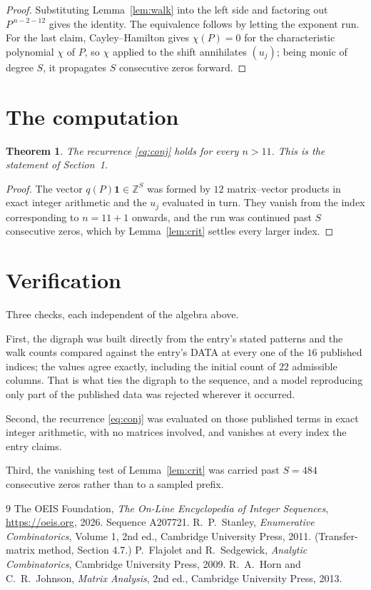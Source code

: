\documentclass[11pt,a4paper]{article}
\theoremstyle{plain}
\newtheorem{theorem}{Theorem}
\theoremstyle{definition}
\begin{document}
\begin{proof}
Substituting Lemma~\ref{lem:walk} into the left side and factoring out
$P^{\,n-2-12}$ gives the identity. The equivalence follows by letting the exponent
run. For the last claim, Cayley--Hamilton gives $\chi(P)=0$ for the characteristic
polynomial $\chi$ of $P$, so $\chi$ applied to the shift annihilates $(u_j)$; being monic of
degree $S$, it propagates $S$ consecutive zeros forward.
\end{proof}

\section{The computation}

\begin{theorem}
The recurrence \eqref{eq:conj} holds for every $n>11$. This is the statement of
Section~1.
\end{theorem}

\begin{proof}
The vector $q(P)\mathbf{1}\in\mathbb{Z}^{S}$ was formed by $12$ matrix--vector
products in exact integer arithmetic and the $u_j$ evaluated in turn. They vanish from the
index corresponding to $n=11+1$ onwards, and the run was continued past $S$ consecutive
zeros, which by Lemma~\ref{lem:crit} settles every larger index.
\end{proof}

\section{Verification}

Three checks, each independent of the algebra above.

First, the digraph was built directly from the entry's stated patterns and the walk counts
compared against the entry's DATA at every one of the $16$ published indices; the
values agree exactly, including the initial count of $22$ admissible columns. That is
what ties the digraph to the sequence, and a model reproducing only part of the published
data was rejected wherever it occurred.

Second, the recurrence \eqref{eq:conj} was evaluated on those published terms in exact
integer arithmetic, with no matrices involved, and vanishes at every index the entry claims.

Third, the vanishing test of Lemma~\ref{lem:crit} was carried past $S=484$ consecutive
zeros rather than to a sampled prefix.

\begin{thebibliography}{9}
 The OEIS Foundation, \emph{The On-Line Encyclopedia of Integer
Sequences}, \url{https://oeis.org}, 2026. Sequence A207721.
 R.~P.~Stanley, \emph{Enumerative Combinatorics}, Volume 1, 2nd ed.,
Cambridge University Press, 2011. (Transfer-matrix method, Section 4.7.)
 P.~Flajolet and R.~Sedgewick, \emph{Analytic Combinatorics}, Cambridge
University Press, 2009.
 R.~A.~Horn and C.~R.~Johnson, \emph{Matrix Analysis}, 2nd ed., Cambridge
University Press, 2013.
\end{thebibliography}
\end{document}
